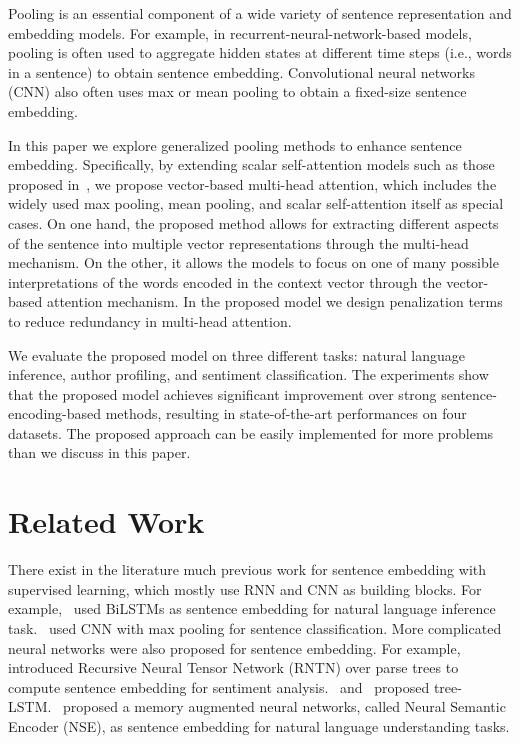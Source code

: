 \documentclass[11pt]{article}
\begin{document}
Pooling is an essential component of a wide variety of sentence representation and embedding models. For example, in recurrent-neural-network-based models, pooling is often used to aggregate hidden states at different time steps (i.e., words in a sentence) to obtain sentence embedding. Convolutional neural networks (CNN) also often uses max or mean pooling to obtain a fixed-size sentence embedding. 

In this paper we explore generalized pooling methods to enhance sentence embedding. Specifically, by extending scalar self-attention models such as those proposed in~, we propose vector-based multi-head attention, which includes the widely used max pooling, mean pooling, and scalar self-attention itself as special cases. On one hand, the proposed method allows for extracting different aspects of the sentence into multiple vector representations through the multi-head mechanism. On the other, it allows the models to focus on one of many possible interpretations of the words encoded in the context vector through the vector-based attention mechanism. In the proposed model we design penalization terms to reduce redundancy in multi-head attention. 

We evaluate the proposed model on three different tasks: natural language inference, author profiling, and sentiment classification. The experiments show that the proposed model achieves significant improvement over strong sentence-encoding-based methods, resulting in state-of-the-art performances on four datasets. The proposed approach can be easily implemented for more problems than we discuss in this paper.

\section{Related Work}

There exist in the literature much previous work for sentence embedding with supervised learning, which mostly use RNN and CNN as building blocks. For example,~ used BiLSTMs as sentence embedding for natural language inference task.~ used CNN with max pooling for sentence classification. More complicated neural networks were also proposed for sentence embedding. For example,~ introduced Recursive Neural Tensor Network (RNTN) over parse trees to compute sentence embedding for sentiment analysis.~ and~ proposed tree-LSTM.~ proposed a memory augmented neural networks, called Neural Semantic Encoder (NSE), as sentence embedding for natural language understanding tasks.
\end{document}
